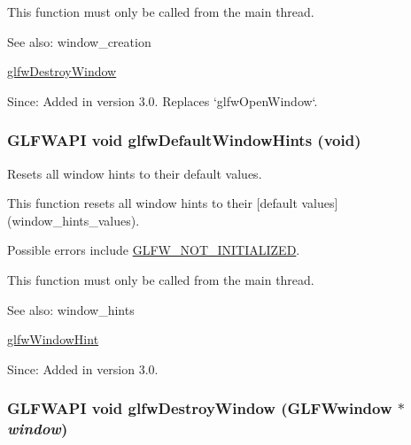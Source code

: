 This function must only be called from the main thread.

\begin{Desc}
\item[See also:]window\_\-creation 

\hyperlink{group__window_g806747476b7247d292be3711c323ea10}{glfwDestroyWindow}\end{Desc}
\begin{Desc}
\item[Since:]Added in version 3.0. Replaces `glfwOpenWindow`. \end{Desc}
\hypertarget{group__window_g8050ddceed9dc6bd9d3aa35666195cd4}{
\subsubsection[glfwDefaultWindowHints]{\setlength{\rightskip}{0pt plus 5cm}GLFWAPI void glfwDefaultWindowHints (void)}}
\label{group__window_g8050ddceed9dc6bd9d3aa35666195cd4}


Resets all window hints to their default values. 

This function resets all window hints to their \mbox{[}default values\mbox{]}(window\_\-hints\_\-values).

Possible errors include \hyperlink{group__errors_g2374ee02c177f12e1fa76ff3ed15e14a}{GLFW\_\-NOT\_\-INITIALIZED}.

This function must only be called from the main thread.

\begin{Desc}
\item[See also:]window\_\-hints 

\hyperlink{group__window_g69c40728499720bef8a49aa925ea0efa}{glfwWindowHint}\end{Desc}
\begin{Desc}
\item[Since:]Added in version 3.0. \end{Desc}
\hypertarget{group__window_g806747476b7247d292be3711c323ea10}{
\subsubsection[glfwDestroyWindow]{\setlength{\rightskip}{0pt plus 5cm}GLFWAPI void glfwDestroyWindow ({\bf GLFWwindow} $\ast$ {\em window})}}
\label{group__window_g806747476b7247d292be3711c323ea10}


